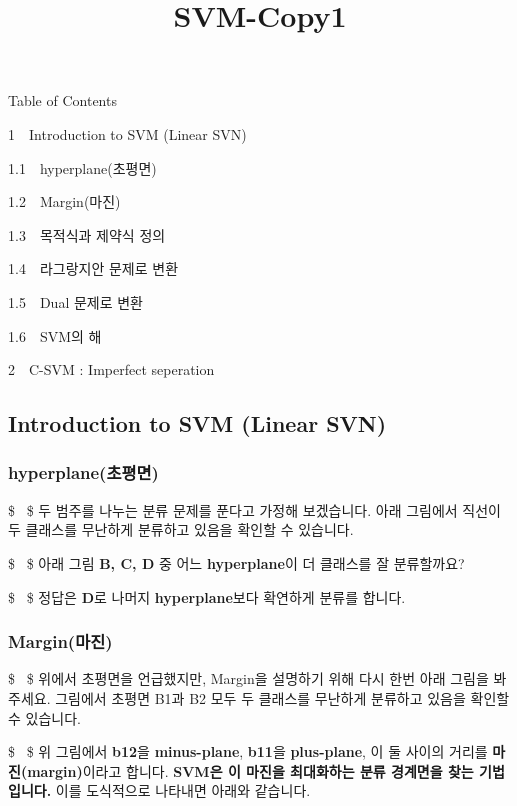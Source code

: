 \documentclass[11pt]{article}
\title{SVM-Copy1}
\begin{document}
    
    
    \maketitle
    
    

    
    Table of Contents{}

{{1~~}Introduction to SVM (Linear SVN)}

{{1.1~~}hyperplane(초평면)}

{{1.2~~}Margin(마진)}

{{1.3~~}목적식과 제약식 정의}

{{1.4~~}라그랑지안 문제로 변환}

{{1.5~~}Dual 문제로 변환}

{{1.6~~}SVM의 해}

{{2~~}C-SVM : Imperfect seperation}

    \subsection{Introduction to SVM (Linear
SVN)}\label{introduction-to-svm-linear-svn}

    \subsubsection{hyperplane(초평면)}\label{hyperplaneuxcd08uxd3c9uxba74}

\$ ~\$ 두 범주를 나누는 분류 문제를 푼다고 가정해 보겠습니다. 아래
그림에서 직선이 두 클래스를 무난하게 분류하고 있음을 확인할 수 있습니다.

\$ ~\$ 아래 그림 \textbf{B, C, D} 중 어느 \textbf{hyperplane}이 더
클래스를 잘 분류할까요?

\$ ~\$ 정답은 \textbf{D}로 나머지 \textbf{hyperplane}보다 확연하게
분류를 합니다.

\subsubsection{Margin(마진)}\label{marginuxb9c8uxc9c4}

\$ ~\$ 위에서 초평면을 언급했지만, Margin을 설명하기 위해 다시 한번 아래
그림을 봐주세요. 그림에서 초평면 B1과 B2 모두 두 클래스를 무난하게
분류하고 있음을 확인할 수 있습니다.

\$ ~\$ 위 그림에서 \textbf{b12}을 \textbf{minus-plane}, \textbf{b11}을
\textbf{plus-plane}, 이 둘 사이의 거리를 \textbf{마진(margin)}이라고
합니다. \textbf{SVM은 이 마진을 최대화하는 분류 경계면을 찾는
기법입니다. } 이를 도식적으로 나타내면 아래와 같습니다.
\end{document}
